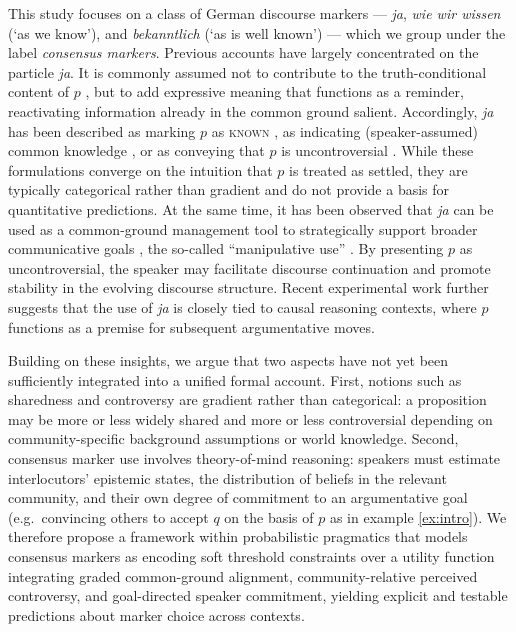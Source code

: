\documentclass[12pt]{article}
\begin{document}
This study focuses on a class of German discourse markers --- \textit{ja}, \textit{wie wir wissen} (`as we know'), and \textit{bekanntlich} (`as is well known') --- which we group under the label \emph{consensus markers}. Previous accounts have largely concentrated on the particle \textit{ja}. It is commonly assumed not to contribute to the truth-conditional content of $p$ \citep{gutzmann2015use,grosz2021discourse}, but to add expressive meaning that functions as a reminder, reactivating information already in the common ground salient. Accordingly, \textit{ja} has been described as marking $p$ as \textsc{known} \citep{thurmair1989modalpartikeln}, as indicating (speaker-assumed) common knowledge \citep{karagjosova2004meaning}, or as conveying that $p$ is uncontroversial \citep{jacobs_semantics_1991,zimmermann2011discourse,waltereit2001modal}. While these formulations converge on the intuition that $p$ is treated as settled, they are typically categorical rather than gradient and do not provide a basis for quantitative predictions. At the same time, it has been observed that \textit{ja} can be used as a common-ground management tool to strategically support broader communicative goals \citep{repp2013common}, the so-called ``manipulative use'' \citep{doring2016modal}. By presenting $p$ as uncontroversial, the speaker may facilitate discourse continuation and promote stability in the evolving discourse structure. Recent experimental work \citep{seemann2025} further suggests that the use of \textit{ja} is closely tied to causal reasoning contexts, where $p$ functions as a premise for subsequent argumentative moves.

Building on these insights, we argue that two aspects have not yet been sufficiently integrated into a unified formal account. First, notions such as sharedness and controversy are gradient rather than categorical: a proposition may be more or less widely shared and more or less controversial depending on community-specific background assumptions or world knowledge. Second, consensus marker use involves theory-of-mind reasoning: speakers must estimate interlocutors' epistemic states, the distribution of beliefs in the relevant community, and their own degree of commitment to an argumentative goal (e.g.\ convincing others to accept $q$ on the basis of $p$ as in example \ref{ex:intro}). We therefore propose a framework within probabilistic pragmatics \citep{goodman2016pragmatic,degen2023rational,franke2016probabilistic} that models consensus markers as encoding soft threshold constraints over a utility function integrating graded common-ground alignment, community-relative perceived controversy, and goal-directed speaker commitment, yielding explicit and testable predictions about marker choice across contexts.
\end{document}
